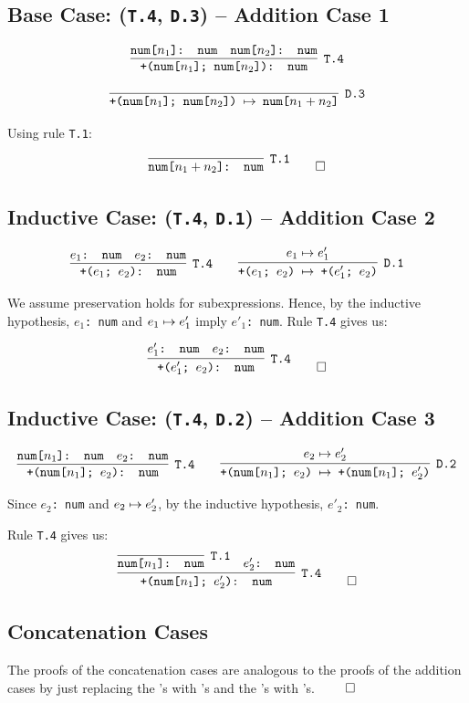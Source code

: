 \subsection{Base Case: (\texttt{T.4}, \texttt{D.3}) -- Addition Case 1}
\[
\cinfer[T.4]{+(num[$n_1$]; num[$n_2$]): num}
  {\code{num[$n_1$]: num} & \code{num[$n_2$]: num}}
\]

\[
\cinfer[D.3]{+(num[$n_1$]; num[$n_2$]) $\stepto$ num[$n_1 + n_2$]}{ }
\]

Using rule \texttt{T.1}:

\[
\cinfer[T.1]{num[$n_1 + n_2$]: num}{ }
\qed
\]

\subsection{Inductive Case: (\texttt{T.4}, \texttt{D.1}) -- Addition Case 2}
\[
\cinfer[T.4]{+($e_1$; $e_2$): num}
  {\code{$e_1$: num} & \code{$e_2$: num}}
\qquad
\cinfer[D.1]{+($e_1$; $e_2$) $\stepto$ +($e'_1$; $e_2$)}{e_1 \stepto e'_1}
\]

We assume preservation holds for subexpressions.
Hence, by the inductive hypothesis,
\texttt{$e_1$: num} and $e_1 \mapsto e'_1$ imply
\texttt{$e'_1$: num}.
Rule \texttt{T.4} gives us:

\[
\cinfer[T.4]{+($e'_1$; $e_2$): num}
  {\code{$e'_1$: num} & \code{$e_2$: num}}
\qed
\]

\subsection{Inductive Case: (\texttt{T.4}, \texttt{D.2}) -- Addition Case 3}
\[
\cinfer[T.4]{+(num[$n_1$]; $e_2$): num}
  {\code{num[$n_1$]: num} & \code{$e_2$: num}}
\qquad
\cinfer[D.2]{+(num[$n_1$]; $e_2$) $\stepto$ +(num[$n_1$]; $e'_2$)}{e_2 \stepto e'_2}
\]

Since \texttt{$e_2$: num} and $e_2 \mapsto e'_2$,
by the inductive hypothesis, \texttt{$e'_2$: num}.

Rule \texttt{T.4} gives us:
\[
\cinfer[T.4]{+(num[$n_1$]; $e'_2$): num}
  {\cinfer[T.1]{num[$n_1$]: num}{ }
   &
   \code{$e'_2$: num}}
\qed
\]

\subsection{Concatenation Cases}
The proofs of the concatenation cases are analogous
to the proofs of the addition cases by just replacing
the 's with 's and the
\code{+}'s with \code{\^{}}'s. $\qed$

